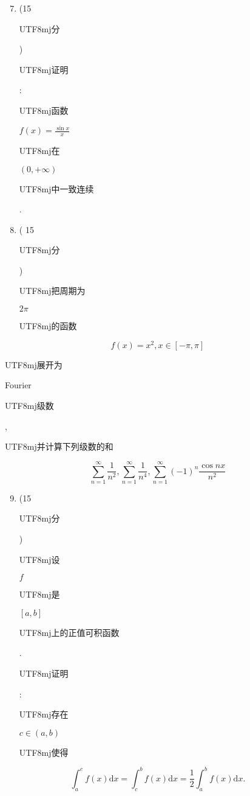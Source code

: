 \documentclass[10pt]{article}
\begin{document}
\begin{enumerate}
  \setcounter{enumi}{6}
  \item (15 \begin{CJK}{UTF8}{mj}分\end{CJK}) \begin{CJK}{UTF8}{mj}证明\end{CJK}: \begin{CJK}{UTF8}{mj}函数\end{CJK} $f(x)=\frac{\sin x}{x}$ \begin{CJK}{UTF8}{mj}在\end{CJK} $(0,+\infty)$ \begin{CJK}{UTF8}{mj}中一致连续\end{CJK}.

  \item ( 15 \begin{CJK}{UTF8}{mj}分\end{CJK}) \begin{CJK}{UTF8}{mj}把周期为\end{CJK} $2 \pi$ \begin{CJK}{UTF8}{mj}的函数\end{CJK}

\end{enumerate}
$$
f(x)=x^{2}, x \in[-\pi, \pi]
$$
\begin{CJK}{UTF8}{mj}展开为\end{CJK} Fourier \begin{CJK}{UTF8}{mj}级数\end{CJK}, \begin{CJK}{UTF8}{mj}并计算下列级数的和\end{CJK}
$$
\sum_{n=1}^{\infty} \frac{1}{n^{2}}, \sum_{n=1}^{\infty} \frac{1}{n^{4}}, \sum_{n=1}^{\infty}(-1)^{n} \frac{\cos n x}{n^{2}}
$$

\begin{enumerate}
  \setcounter{enumi}{8}
  \item (15 \begin{CJK}{UTF8}{mj}分\end{CJK}) \begin{CJK}{UTF8}{mj}设\end{CJK} $f$ \begin{CJK}{UTF8}{mj}是\end{CJK} $[a, b]$ \begin{CJK}{UTF8}{mj}上的正值可积函数\end{CJK}. \begin{CJK}{UTF8}{mj}证明\end{CJK}: \begin{CJK}{UTF8}{mj}存在\end{CJK} $c \in(a, b)$ \begin{CJK}{UTF8}{mj}使得\end{CJK}
\end{enumerate}
$$
\int_{a}^{c} f(x) \mathrm{d} x=\int_{c}^{b} f(x) \mathrm{d} x=\frac{1}{2} \int_{a}^{b} f(x) \mathrm{d} x .
$$
\end{document}
